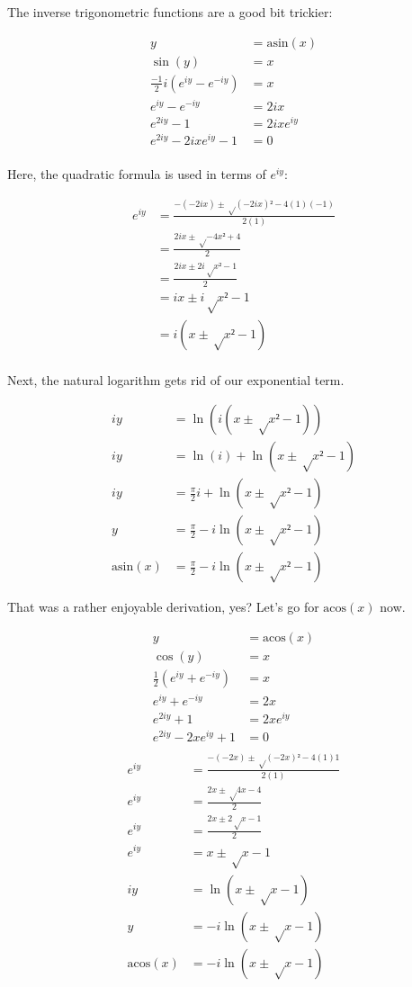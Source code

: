 \documentclass[10pt]{article}
\begin{document}
\begin{multicols}{2}
The inverse trigonometric functions are a good bit trickier:

\begin{align*}
    y &= \mathrm{asin}(x) \\
    \sin(y) &= x \\
    \frac{-1}{2}i (e^{iy} - e^{-iy}) &= x \\
    e^{iy} - e^{-iy} &= 2ix \\
    e^{2iy} - 1 &= 2ix e^{iy} \\
    e^{2iy} - 2ix e^{iy} - 1 &= 0 \\
\end{align*}

Here, the quadratic formula is used in terms of $e^{iy}$:

\begin{align*}
    e^{iy} &= \frac{ -(-2ix) ± √{(-2ix)² - 4(1)(-1)} }{2(1)} \\
    &= \frac{ 2ix ± √{-4x² + 4} }{2} \\
    &= \frac{ 2ix ± 2i √{x² - 1}}{2} \\
    &= ix ± i √{x² - 1} \\
    &= i(x ± √{x² - 1}) \\
\end{align*}

Next, the natural logarithm gets rid of our exponential term.

\begin{align*}
    iy &= \ln(i (x ± √{x² - 1})) \\
    iy &= \ln(i) + \ln(x ± √{x² - 1}) \\
    iy &= \frac{π}{2}i + \ln(x ± √{x² - 1}) \\
    y &= \frac{π}{2} - i \ln(x ± √{x² - 1}) \\
    \mathrm{asin}(x) &= \frac{π}{2} - i \ln(x ± √{x² - 1})
\end{align*}

That was a rather enjoyable derivation, yes? Let's go for $\mathrm{acos}(x)$ now.

\begin{align*}
    y &= \mathrm{acos}(x) \\
    \cos(y) &= x \\
    \frac{1}{2} (e^{iy} + e^{-iy}) &= x \\
    e^{iy} + e^{-iy} &= 2x \\
    e^{2iy} + 1 &= 2x e^{iy} \\
    e^{2iy} - 2x e^{iy} + 1 &= 0 \\
\end{align*}
\begin{align*}
    e^{iy} &= \frac{ -(-2x) ± √{(-2x)² - 4(1)1} }{2(1)} \\
    e^{iy} &= \frac{ 2x ± √{4x - 4} }{2} \\
    e^{iy} &= \frac{ 2x ± 2 √{x - 1} }{2} \\
    e^{iy} &= x ± √{x - 1} \\
    iy &= \ln(x ± √{x - 1}) \\
    y &= -i \ln(x ± √{x - 1}) \\
    \mathrm{acos}(x) &= -i \ln(x ± √{x - 1})
\end{align*}

\end{multicols}
\end{document}

